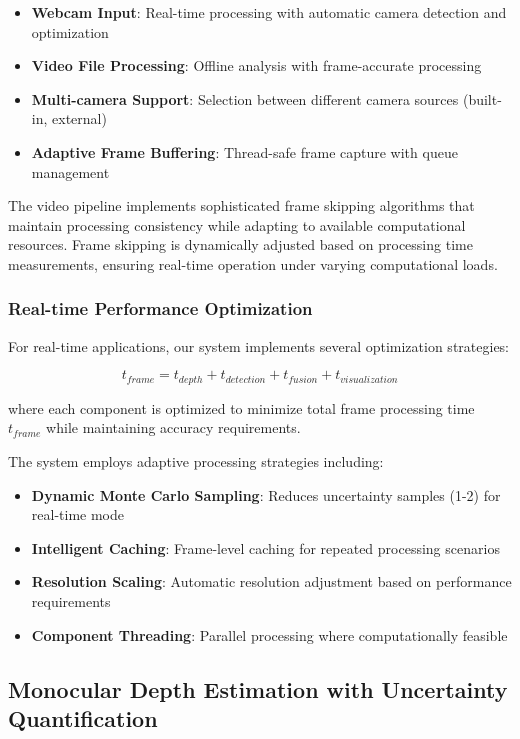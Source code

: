 \documentclass[12pt,oneside]{book}
\begin{document}
\begin{itemize}
\item \textbf{Webcam Input}: Real-time processing with automatic camera detection and optimization
\item \textbf{Video File Processing}: Offline analysis with frame-accurate processing
\item \textbf{Multi-camera Support}: Selection between different camera sources (built-in, external)
\item \textbf{Adaptive Frame Buffering}: Thread-safe frame capture with queue management
\end{itemize}

The video pipeline implements sophisticated frame skipping algorithms that maintain processing consistency while adapting to available computational resources. Frame skipping is dynamically adjusted based on processing time measurements, ensuring real-time operation under varying computational loads.

\subsubsection{Real-time Performance Optimization}

For real-time applications, our system implements several optimization strategies:

\begin{equation}
t_{frame} = t_{depth} + t_{detection} + t_{fusion} + t_{visualization}
\label{eq:frame_timing}
\end{equation}

where each component is optimized to minimize total frame processing time $t_{frame}$ while maintaining accuracy requirements.

The system employs adaptive processing strategies including:
\begin{itemize}
\item \textbf{Dynamic Monte Carlo Sampling}: Reduces uncertainty samples (1-2) for real-time mode
\item \textbf{Intelligent Caching}: Frame-level caching for repeated processing scenarios
\item \textbf{Resolution Scaling}: Automatic resolution adjustment based on performance requirements
\item \textbf{Component Threading}: Parallel processing where computationally feasible
\end{itemize}

\subsection{Monocular Depth Estimation with Uncertainty Quantification}
\end{document}
